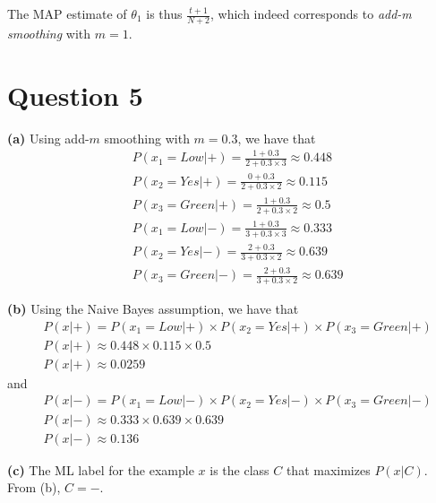 \documentclass[leqno]{article}
\begin{document}
The MAP estimate of $\theta_1$ is thus $\frac{t + 1}{N + 2}$, which indeed corresponds to \textit{add-m smoothing} with $m = 1$.  


\section*{Question 5}

\noindent \textbf{(a)} Using add-$m$ smoothing with $m = 0.3$, we have that
\begin{equation*}
\begin{split}
&P(x_1 = Low|+) = \frac{1 + 0.3}{2 + 0.3\times3} \approx 0.448
\\
&P(x_2 = Yes|+) = \frac{0 + 0.3}{2 + 0.3\times2} \approx 0.115
\\
&P(x_3 = Green|+) = \frac{1 + 0.3}{2 + 0.3\times2} \approx 0.5
\\
&P(x_1 = Low|-) = \frac{1 + 0.3}{3 + 0.3\times3} \approx 0.333
\\
&P(x_2 = Yes|-) = \frac{2 + 0.3}{3 + 0.3\times2} \approx 0.639
\\
&P(x_3 = Green|-) = \frac{2 + 0.3}{3 + 0.3\times2} \approx 0.639
\end{split}
\end{equation*}

\hfill

\noindent \textbf{(b)} Using the Naive Bayes assumption, we have that
\begin{equation*}
\begin{split}
&P(x|+) = P(x_1 = Low|+) \times P(x_2 = Yes|+) \times P(x_3 = Green|+)
\\
&P(x|+) \approx 0.448 \times 0.115 \times 0.5
\\
&P(x|+) \approx 0.0259
\end{split}
\end{equation*}
and
\begin{equation*}
\begin{split}
&P(x|-) = P(x_1 = Low|-) \times P(x_2 = Yes|-) \times P(x_3 = Green|-)
\\
&P(x|-) \approx 0.333 \times 0.639 \times 0.639
\\
&P(x|-) \approx 0.136
\end{split}
\end{equation*}


\hfill

\noindent \textbf{(c)} The ML label for the example $x$ is the class $C$ that
maximizes $P(x|C)$. From (b), $C = -$.

\hfill
\end{document}
